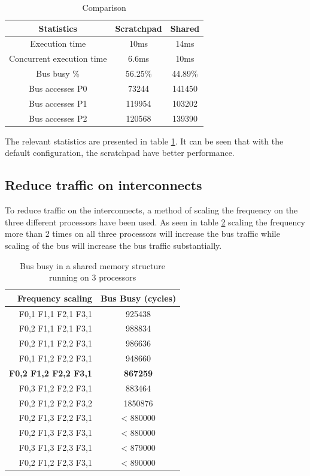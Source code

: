 \documentclass[a4paper, 12pt]{article}
\begin{document}
\begin{table}[h]
  \centering
  \begin{tabular}{c | c c}
    \hline
    Statistics & Scratchpad & Shared \\
    \hline
    Execution time & 10ms & 14ms \\
    Concurrent execution time & 6.6ms & 10ms \\
    Bus busy \% & 56.25\% & 44.89\% \\
    Bus accesses P0 & 73244 & 141450 \\
    Bus accesses P1 & 119954 & 103202 \\
    Bus accesses P2 & 120568 & 139390  \\
    \hline    
  \end{tabular}
  \caption{Comparison}
  \label{fig:comparison}
\end{table}
The relevant statistics are presented in table \ref{fig:comparison}. It can be
seen that with the default configuration, the scratchpad have better
performance.

\subsection{Reduce traffic on interconnects}
To reduce traffic on the interconnects, a method of scaling the
frequency on the three different processors have been used. As seen in
table \ref{tab:busbusy} scaling the frequency more than 2 times on all three
processors will increase the bus traffic while scaling of the bus will
increase the bus traffic substantially.
\begin{table}[h]
  \centering
  \begin{tabular}[c]{r | c}
    Frequency scaling   & Bus Busy (cycles)\\
    \hline
    F0,1 F1,1 F2,1 F3,1 & 925438\\
    F0,2 F1,1 F2,1 F3,1 & 988834\\
    F0,2 F1,1 F2,2 F3,1 & 986636\\
    F0,1 F1,2 F2,2 F3,1 & 948660\\
    \textbf{F0,2 F1,2 F2,2 F3,1} & \textbf{867259}\\
    F0,3 F1,2 F2,2 F3,1 & 883464\\
    F0,2 F1,2 F2,2 F3,2 & 1850876\\
    F0,2 F1,3 F2,2 F3,1 & < 880000\\
    F0,2 F1,3 F2,3 F3,1 & < 880000\\
    F0,3 F1,3 F2,3 F3,1 & < 879000\\
    F0,2 F1,2 F2,3 F3,1 & < 890000\\
  \end{tabular}
  \caption{Bus busy in a shared memory structure running on 3 processors}
  \label{tab:busbusy}
\end{table}
\end{document}
